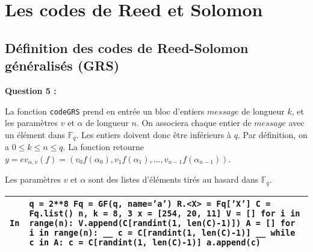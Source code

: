 \documentclass[titlepage]{article}
\begin{document}
    \section{Les codes de Reed et Solomon}
        \subsection{Définition des codes de Reed-Solomon \\ généralisés (GRS)}

        \textbf{Question 5 :}

        La fonction \texttt{codeGRS} prend en entrée un bloc d'entiers $message$ de longueur $k$, et les paramètres $v$ et $\alpha$ de longueur $n$.
        On associera chaque entier de $message$ avec un élément dans $\mathbb{F}_q$. Les entiers doivent donc être inférieurs à $q$.
        Par définition, on a $0 \leqslant k \leqslant n \leqslant q$. La fonction retourne $y = ev_{\alpha,v}(f) = (v_0f(\alpha_0), v_1f(\alpha_1), ..., v_{n-1}f(\alpha_{n-1}))$.

        Les paramètres $v$ et $\alpha$ sont des listes d'éléments tirés au hasard dans $\mathbb{F}_q$.

        

        \begin{tabularx}{12cm}{|p{0.60cm}|X|}
            \hline
            \rowcolor{gray}
            \texttt{In}
            & 
            \texttt{q = 2**8\newline
            Fq = GF(q, name='a')\newline
            R.<X> = Fq['X']\newline
            C = Fq.list()\newline
            n, k = 8, 3\newline
            \newline
            x = [254, 20, 11]\newline
            \newline
            V = []\newline
            for i in range(n):\newline
            V.append(C[randint(1, len(C)-1)])\newline
            \newline
            A = []\newline
            for i in range(n): \newline
            \_\_ c = C[randint(1, len(C)-1)]\newline
            \_\_ while c in A:
            c = C[randint(1, len(C)-1)]\newline
            a.append(c)}
            \\
            \hline
            \end{tabularx}
            \bigbreak
\end{document}
